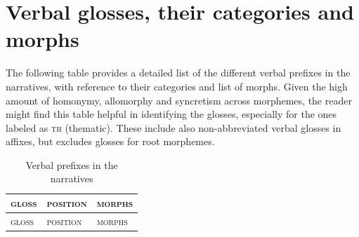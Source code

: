 \section*{Verbal glosses, their categories and morphs}\label{appendix:verbglosses}

The following table provides a detailed list of the different verbal prefixes in the narratives, with reference to their categories and list of morphs. Given the high amount of homonymy, allomorphy and syncretism across morphemes, the reader might find this table helpful in identifying the glosses, especially for the ones labeled as \textsc{th} (thematic). These include also non-abbreviated verbal glosses in affixes, but excludes glosses for root morphemes.

\begin{xltabular}{\textwidth}{llX}
\caption{Verbal prefixes in the narratives} \label{tab:abbrevverb}\\

    \lsptoprule
        \textsc{gloss} & \textsc{position} & \textsc{morphs}\\
    \midrule
    \endfirsthead
    \toprule
        \textsc{gloss} & \textsc{position} & \textsc{morphs}\\
	\midrule
    \endhead


\end{xltabular}

